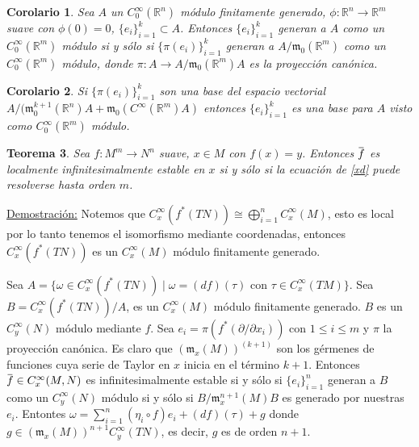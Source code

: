 \documentclass{report}
\newtheorem{theorem}{Teorema}[section]
\newtheorem{coro}[theorem]{Corolario}
\theoremstyle{definition}
\newcommand{\overbar}[1]{\mkern 1.5mu\overline{\mkern-1.5mu#1\mkern-1.5mu}\mkern 1.5mu}
\begin{document}
\begin{coro}
Sea $A$ un $C^\infty_0 (\mathbb{R}^n)$ m\'odulo finitamente generado, $\phi: \mathbb{R}^n \to \mathbb{R}^m$ suave con $\phi (0) = 0$, $\{ e_i \}_{i=1}^k \subset A$. Entonces $\{ e_i \}_{i=1}^k$ generan a $A$ como un $C^\infty_0 (\mathbb{R}^m)$ m\'odulo si y s\'olo si $\{ \pi(e_i) \}_{i=1}^k$ generan a $A/\mathfrak{m}_0 (\mathbb{R}^m)$ como un $C^\infty_0 (\mathbb{R}^m)$ m\'odulo, donde $\pi: A \to A/\mathfrak{m}_0 (\mathbb{R}^m) A$ es la proyecci\'on can\'onica.
\end{coro}

\begin{coro}
Si $\{ \pi (e_i) \}_{i=1}^k$ son una base del espacio vectorial \\$A/(\mathfrak{m}_0^{k+1} (\mathbb{R}^n) A + \mathfrak{m}_0 (C^\infty(\mathbb{R}^m)A)$ entonces $\{ e_i \}_{i=1}^k$ es una base para $A$ visto como $C^\infty_0 (\mathbb{R}^m)$ m\'odulo.
\end{coro}

\begin{theorem}
Sea $f: M^m \to N^n$ suave, $x \in M$ con $f(x) = y$. Entonces $\overbar{f}$ es localmente infinitesimalmente estable en $x$ si y s\'olo si la ecuaci\'on de \ref{xd} puede resolverse hasta orden $m$.
\end{theorem}

\underline{Demostraci\'on:} Notemos que $C^\infty_x (f^\ast (TN)) \cong \bigoplus_{i=1}^n C^\infty_x (M)$, esto es local por lo tanto tenemos el isomorfismo mediante coordenadas, entonces $C^\infty_x (f^\ast(TN))$ es un $C^\infty_x (M)$ m\'odulo finitamente generado. 

Sea $A = \{ \omega \in C^\infty_x (f^\ast (TN)) \mid \omega = (df)(\tau) \text{ con } \tau \in C^\infty_x (TM) \}$. Sea $B = C^\infty_x (f^\ast (TN))/A$, es un $C^\infty_x(M)$ m\'odulo finitamente generado. $B$ es un $C^\infty_y (N)$ m\'odulo mediante $f$. Sea $e_i = \pi (f^\ast (\partial / \partial x_i ))$ con $1 \leq i \leq m$ y $\pi$ la proyecci\'on can\'onica. Es claro que $(\mathfrak{m}_x (M))^{(k+1)}$ son los g\'ermenes de funciones cuya serie de Taylor en $x$ inicia en el t\'ermino $k+1$. Entonces $\overbar{f} \in C^\infty_x (M,N)$ es infinitesimalmente estable si y s\'olo si $\{e_i \}_{i=1}^n$ generan a $B$ como un $C^\infty_y (N)$ m\'odulo si y s\'olo si $B/\mathfrak{m}_x^{n+1} (M) B $ es generado por nuestras $e_i$. Entontes $\omega = \sum\limits_{i=1}^n (\eta_i \circ f) e_i + (df)(\tau) + g$ donde $g \in (\mathfrak{m}_x (M))^{n+1} C^\infty_y (TN)$, es decir, $g$ es de orden $n+1$.
\end{document}
